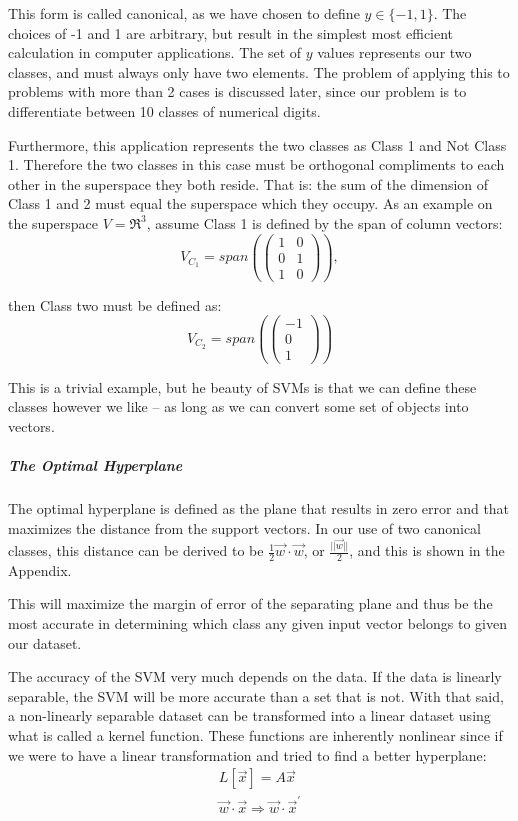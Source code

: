 This form is called canonical, as we have chosen to define $y \in \{-1, 1\}$. The choices of -1 and 1 are arbitrary, but result in the simplest most efficient calculation in computer applications. The set of $y$ values represents our two classes, and must always only have two elements. The problem of applying this to problems with more than 2 cases is discussed later, since our problem is to differentiate between 10 classes of numerical digits.

Furthermore, this application represents the two classes as Class 1 and Not Class 1. Therefore the two classes in this case must be orthogonal compliments to each other in the superspace they both reside. That is: the sum of the dimension of Class 1 and 2 must equal the superspace which they occupy. As an example on the superspace $V = \Re^3$, assume Class 1 is defined by the span of column vectors: 
\begin{equation}
V_{C_{1}} = 
span(\begin{pmatrix}
1 & 0 \\0 & 1\\1& 0
\end{pmatrix}),
\end{equation}

then Class two must be defined as:
\begin{equation}
V_{C_{2}} = span(\begin{pmatrix}
-1\\0\\1
\end{pmatrix}
)
\end{equation}

This is a trivial example, but he beauty of SVMs is that we can define these classes however we like -- as long as we can convert some set of objects into vectors.
\subparagraph{The Optimal Hyperplane}

The optimal hyperplane is defined as the plane that results in zero error and that maximizes the distance from the support vectors. In our use of two canonical classes, this distance can be derived to be $\frac{1}{2}\vec{w}\cdot\vec{w}$, or $\frac{||\vec{w}||}{2}$, and this is shown in the Appendix.

This will maximize the margin of error of the separating plane and thus be the most accurate in determining which class any given input vector belongs to given our dataset. 

The accuracy of the SVM very much depends on the data. If the data is linearly separable, the SVM will be more accurate than a set that is not. With that said, a non-linearly separable dataset can be transformed into a linear dataset using what is called a kernel function. These functions are inherently nonlinear since if we were to have a linear transformation and tried to find a better hyperplane:
\begin{equation}
\begin{gathered}
	L[\vec{x}] = A\vec{x} \\
	\vec{w}\cdot \vec{x} \Rightarrow \vec{w} \cdot \vec{x}^{'} 
\end{gathered}
\end{equation}


